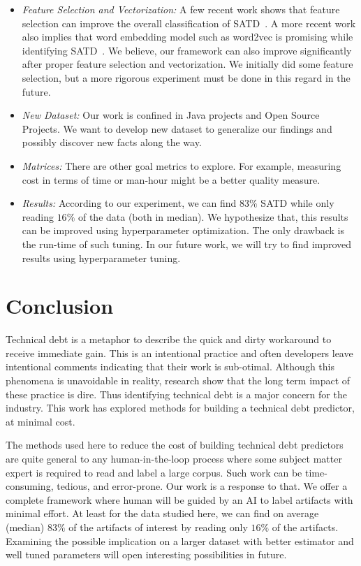 \documentclass[10pt,conference]{IEEEtran}
\begin{document}
\begin{itemize}
    \item \textit{Feature Selection and Vectorization:} A few recent work shows that feature selection can improve the overall classification of SATD~\cite{huang2018identifying}. 
    A more recent work also implies that word embedding model such as word2vec is promising while identifying SATD~\cite{flisar2018enhanced}. 
    We believe, our framework can also improve significantly after proper feature selection and vectorization. 
    We initially did some feature selection, but a more rigorous experiment must be done in this regard in the future.
    \item \textit{New Dataset:} Our work is confined in Java projects and Open Source Projects. 
    We want to develop new dataset to generalize our findings and possibly discover new facts along the way.
    \item \textit{Matrices:} There are other goal metrics
    to explore.  
    For example, measuring cost in terms of time or man-hour might be a better quality measure. 
    \item \textit{Results:} According to our experiment, we can find $83\%$ SATD while only reading $16\%$ of the data (both in median).
    We hypothesize that, this results can be improved using hyperparameter optimization. 
    The only drawback is the run-time of such tuning. In our future work, we will try to find improved results using hyperparameter tuning. 
\end{itemize}

\section{Conclusion}
Technical debt is a metaphor to describe the quick and dirty workaround to receive immediate gain. 
This is an intentional practice and often developers leave intentional comments indicating that their work is sub-otimal. 
Although this phenomena is unavoidable in reality, research show that the long term impact of these practice is dire. 
Thus identifying technical debt is a major concern for the industry.
This work has explored methods for building a technical debt predictor, at minimal cost.

The methods used here to reduce the cost of building technical debt
predictors are quite general to any human-in-the-loop process where some subject matter expert is required to read and label a large corpus. Such work can be time-consuming, tedious, and error-prone.
Our work is a response to that. 
We offer a complete framework where human will be guided by an AI to label artifacts with minimal effort. 
At least for the data studied here,
we can find on average (median) $83\%$ of the artifacts
of interest   by reading only $16\%$ of the artifacts. 
Examining the possible implication on a larger dataset with better estimator and well tuned parameters will open interesting possibilities in future. 
\end{document}
